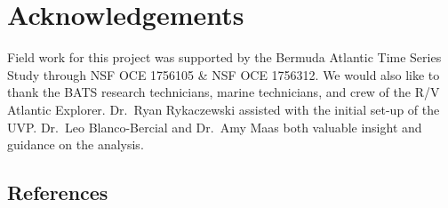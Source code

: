 \documentclass[
]{article}
\begin{document}
\hypertarget{acknowledgements}{%
\section{Acknowledgements}\label{acknowledgements}}

Field work for this project was supported by the Bermuda Atlantic Time
Series Study through NSF OCE 1756105 \& NSF OCE 1756312. We would also
like to thank the BATS research technicians, marine technicians, and
crew of the R/V Atlantic Explorer. Dr.~Ryan Rykaczewski assisted with
the initial set-up of the UVP. Dr.~Leo Blanco-Bercial and Dr.~Amy Maas
both valuable insight and guidance on the analysis.

\hypertarget{references}{%
\subsection{References}\label{references}}
\end{document}
